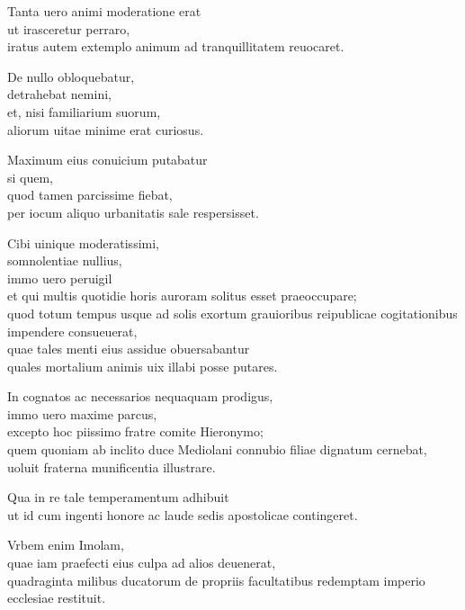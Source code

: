 \documentclass[a5paper,twoside]{article}
\begin{document}
Tanta uero animi moderatione erat \\
ut irasceretur perraro, \\
iratus autem extemplo animum ad tranquillitatem reuocaret. 

De nullo obloquebatur, \\
detrahebat nemini, \\
et, nisi familiarium suorum, \\
aliorum uitae minime erat curiosus. 

Maximum eius conuicium putabatur \\
si quem, \\
quod tamen parcissime fiebat, \\
per iocum aliquo urbanitatis sale respersisset.

Cibi uinique moderatissimi, \\
somnolentiae nullius, \\
immo uero peruigil \\
et qui multis quotidie horis auroram solitus esset praeoccupare; \\
quod totum tempus usque ad solis exortum grauioribus reipublicae cogitationibus impendere consueuerat, \\
quae tales menti eius assidue obuersabantur \\
quales mortalium animis uix illabi posse putares. 

In cognatos ac necessarios nequaquam prodigus, \\
immo uero maxime parcus, \\
excepto hoc piissimo fratre comite Hieronymo; \\
quem quoniam ab inclito duce Mediolani connubio filiae dignatum cernebat, \\
uoluit fraterna munificentia illustrare.  

Qua in re tale temperamentum adhibuit \\
ut id cum ingenti honore ac laude sedis apostolicae contingeret. 

Vrbem enim Imolam, \\
quae iam praefecti eius culpa ad alios deuenerat, \\
quadraginta milibus ducatorum de propriis facultatibus redemptam imperio ecclesiae restituit. 
\end{document}
